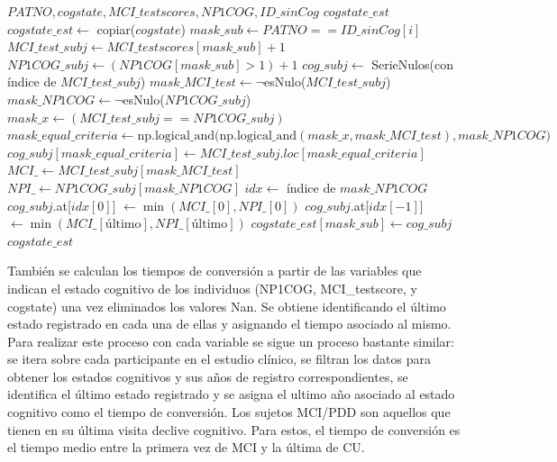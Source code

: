 \begin{algorithm}
	\caption{estimate\_cogstate\_sin}
	\begin{algorithmic}
		\REQUIRE $PATNO, cogstate, MCI\_testscores, NP1COG, ID\_sinCog$
		\ENSURE $cogstate\_est$
		\STATE $cogstate\_est \leftarrow$ copiar($cogstate$)
		\STATE $mask\_sub \leftarrow PATNO == ID\_sinCog[i]$
		\STATE $MCI\_test\_subj \leftarrow MCI\_testscores[mask\_sub] + 1$
		\STATE $NP1COG\_subj \leftarrow (NP1COG[mask\_sub] > 1) + 1$
		\STATE $cog\_subj \leftarrow$ SerieNulos(con índice de $MCI\_test\_subj$)
		\STATE $mask\_MCI\_test \leftarrow \neg$esNulo($MCI\_test\_subj$)
		\STATE $mask\_NP1COG \leftarrow \neg$esNulo($NP1COG\_subj$)
		\STATE $mask\_x \leftarrow (MCI\_test\_subj == NP1COG\_subj)$
		\STATE $mask\_equal\_criteria \leftarrow \text{np.logical\_and(np.logical\_and}(mask\_x, mask\_MCI\_test), mask\_NP1COG)$
		\STATE $cog\_subj[mask\_equal\_criteria] \leftarrow MCI\_test\_subj.loc[mask\_equal\_criteria]$
		\ELSE
		\STATE $MCI\_ \leftarrow MCI\_test\_subj[mask\_MCI\_test]$
		\STATE $NPI\_ \leftarrow NP1COG\_subj[mask\_NP1COG]$
		\STATE $idx \leftarrow$ índice de $mask\_NP1COG$
		\STATE $cog\_subj$.at[$idx[0]$] $\leftarrow \min(MCI\_[0], NPI\_[0])$
		\STATE $cog\_subj$.at[$idx[-1]$] $\leftarrow \min(MCI\_[\text{último}], NPI\_[\text{último}])$
		\ENDIF
		\ENDIF
		\STATE $cogstate\_est[mask\_sub] \leftarrow cog\_subj$
		\ENDFOR
		\RETURN $cogstate\_est$
	\end{algorithmic}
\end{algorithm}

También se calculan los tiempos de conversión a partir de las variables que indican el estado cognitivo de los individuos (NP1COG, MCI\_testscore, y cogstate) una vez eliminados los valores Nan. Se obtiene identificando el último estado registrado en cada una de ellas y asignando el tiempo asociado al mismo. Para realizar este proceso con cada variable se sigue un proceso bastante similar: se itera sobre cada participante en el estudio clínico, se filtran los datos para obtener los estados cognitivos y sus años de registro correspondientes, se identifica el último estado registrado y se asigna el ultimo año asociado al estado cognitivo como el tiempo de conversión. Los sujetos MCI/PDD son aquellos que tienen en su última visita declive cognitivo. Para estos, el tiempo de conversión es el tiempo medio entre la primera vez de MCI y la última de CU.\\

